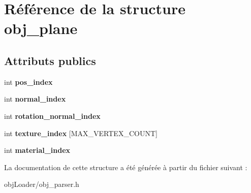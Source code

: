 \hypertarget{structobj__plane}{\section{Référence de la structure obj\-\_\-plane}
\label{structobj__plane}
}
\subsection*{Attributs publics}
\begin{DoxyCompactItemize}
\item 
\hypertarget{structobj__plane_abaa3eff0fff8deaa67eb4be6869b7048}{int {\bfseries pos\-\_\-index}}\label{structobj__plane_abaa3eff0fff8deaa67eb4be6869b7048}

\item 
\hypertarget{structobj__plane_acf720ed71df9e09ab0797d61ffdf7663}{int {\bfseries normal\-\_\-index}}\label{structobj__plane_acf720ed71df9e09ab0797d61ffdf7663}

\item 
\hypertarget{structobj__plane_a0c0c054b3a747f4ec2486fdf367efa36}{int {\bfseries rotation\-\_\-normal\-\_\-index}}\label{structobj__plane_a0c0c054b3a747f4ec2486fdf367efa36}

\item 
\hypertarget{structobj__plane_a38a87ad9ef6583b136c8438c2bd4229b}{int {\bfseries texture\-\_\-index} \mbox{[}M\-A\-X\-\_\-\-V\-E\-R\-T\-E\-X\-\_\-\-C\-O\-U\-N\-T\mbox{]}}\label{structobj__plane_a38a87ad9ef6583b136c8438c2bd4229b}

\item 
\hypertarget{structobj__plane_ae0783771277bc7c8b2b8743015104291}{int {\bfseries material\-\_\-index}}\label{structobj__plane_ae0783771277bc7c8b2b8743015104291}

\end{DoxyCompactItemize}


La documentation de cette structure a été générée à partir du fichier suivant \-:\begin{DoxyCompactItemize}
\item 
obj\-Loader/obj\-\_\-parser.\-h\end{DoxyCompactItemize}
